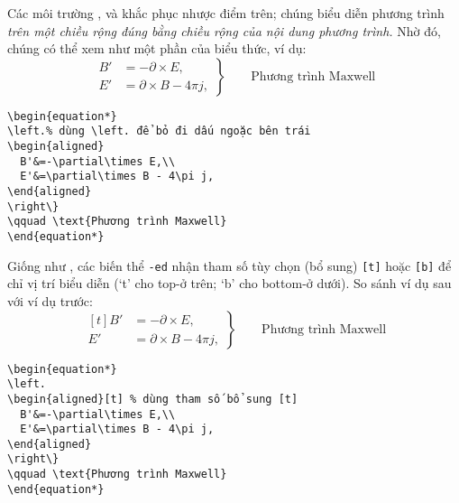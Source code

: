 \medskip
Các môi trường  ,  và  khắc phục
nhược điểm trên; chúng biểu diễn phương trình \emph{trên một chiều rộng đúng bằng chiều
rộng của nội dung phương trình.} Nhờ đó, chúng có thể xem như một phần của biểu thức,
ví dụ:
\begin{equation*}
\left.%
\begin{aligned}
  B'&=-\partial\times E,\\
  E'&=\partial\times B - 4\pi j,
\end{aligned}
\right\}
\qquad \text{Phương trình Maxwell}
\end{equation*}
\begin{verbatim}
\begin{equation*}
\left.% dùng \left. để bỏ đi dấu ngoặc bên trái
\begin{aligned}
  B'&=-\partial\times E,\\
  E'&=\partial\times B - 4\pi j,
\end{aligned}
\right\}
\qquad \text{Phương trình Maxwell}
\end{equation*}
\end{verbatim}

\medskip
Giống như , các biến thể \texttt{-ed} nhận tham số tùy chọn (bổ sung)
\verb'[t]' hoặc \verb'[b]' để chỉ vị trí biểu diễn (`t' cho top-ở trên;
`b' cho bottom-ở dưới). So sánh ví dụ sau với ví dụ trước:
\begin{equation*}
\left.%
\begin{aligned}[t]
  B'&=-\partial\times E,\\
  E'&=\partial\times B - 4\pi j,
\end{aligned}
\right\}
\qquad \text{Phương trình Maxwell}
\end{equation*}
\begin{verbatim}
\begin{equation*}
\left.
\begin{aligned}[t] % dùng tham số bổ sung [t]
  B'&=-\partial\times E,\\
  E'&=\partial\times B - 4\pi j,
\end{aligned}
\right\}
\qquad \text{Phương trình Maxwell}
\end{equation*}
\end{verbatim}

